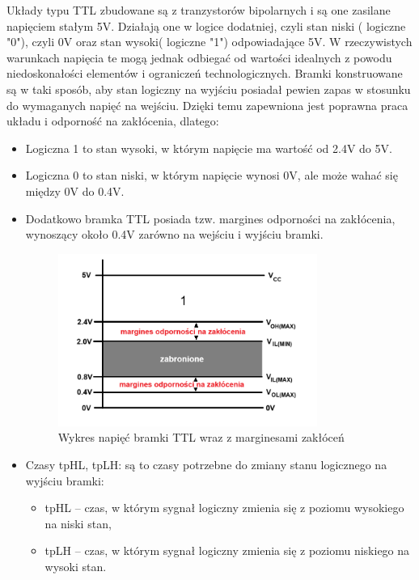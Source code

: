 \documentclass{article}
\begin{document}
    Układy typu TTL zbudowane są z tranzystorów bipolarnych i są one zasilane napięciem stałym 5V. Działają one w logice dodatniej, czyli stan niski ( logiczne "0"), czyli 0V oraz stan wysoki( logiczne "1") odpowiadające 5V. W rzeczywistych warunkach napięcia te mogą jednak odbiegać od wartości idealnych z powodu niedoskonałości elementów i ograniczeń technologicznych\cite{maciak,wiki,TI7400}.
    \pagebreak
    \vspace*{-4em}
    Bramki konstruowane są w taki sposób, aby stan logiczny na wyjściu posiadał pewien zapas w stosunku do wymaganych napięć na wejściu\cite{TI7400}. Dzięki temu zapewniona jest poprawna praca układu i odporność na zakłócenia, dlatego:
    \vspace{-0.5em}
    \begin{itemize}
    
        \item Logiczna 1 to stan wysoki, w którym napięcie ma wartość od 2.4V do 5V.
        \item Logiczna 0 to stan niski, w którym napięcie wynosi 0V, ale może wahać się między 0V do 0.4V.
        \vspace{-0.5em}
        \item Dodatkowo bramka TTL posiada tzw. margines odporności na zakłócenia, wynoszący około 0.4V zarówno na wejściu i wyjściu bramki.
        \vspace{-1em}
        \begin{figure}[h]
        	\centering
        	\includegraphics[width=0.8\textwidth]{margines.PNG}
        	\vspace{-1em}
        	\caption{Wykres napięć bramki TTL wraz z marginesami zakłóceń}
        	\label{fig:moj_obrazek}
        \end{figure}
        \vspace{-1.5em}
        \item Czasy tpHL, tpLH: są to czasy potrzebne do zmiany stanu logicznego na wyjściu bramki: 
        \begin{itemize}
        \vspace{-0.5em}
            \item tpHL – czas, w którym sygnał logiczny zmienia się z poziomu wysokiego na niski stan,
            \item tpLH – czas, w którym sygnał logiczny zmienia się z poziomu niskiego na wysoki stan.
        \end{itemize}
    \end{itemize}
    
\end{document}

